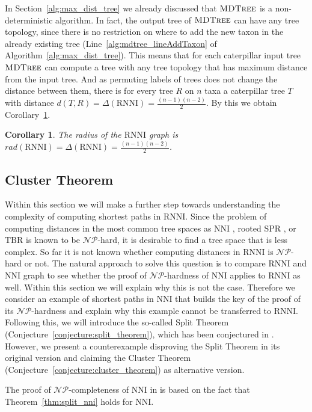 \documentclass{amsart}
\newcommand{\np}{\mathcal{NP}}
\newcommand{\nni}{\mathrm{NNI}}
\newcommand{\rnni}{\mathrm{RNNI}}
\newcommand{\tbr}{\mathrm{TBR}}
\newcommand{\spr}{\mathrm{SPR}}
\newcommand{\mdtree}{\textsc{MDTree}}
\newtheorem{corollary}[definition]{Corollary}
\begin{document}
In Section~\ref{alg:max_dist_tree} we already discussed that $\mdtree$ is a non-deterministic algorithm.
In fact, the output tree of $\mdtree$ can have any tree topology, since there is no restriction on where to add the new taxon in the already existing tree (Line~\ref{alg:mdtree_lineAddTaxon} of Algorithm~\ref{alg:max_dist_tree}).
This means that for each caterpillar input tree $\mdtree$ can compute a tree with any tree topology that has maximum distance from the input tree.
And as permuting labels of trees does not change the distance between them, there is for every tree $R$ on $n$ taxa a caterpillar tree $T$ with distance $d(T,R) = \Delta(\rnni) = \frac{(n-1)(n-2)}{2}$.
By this we obtain Corollary~\ref{corollary:radius}.

\begin{corollary}
The radius of the $\rnni$ graph is $rad(\rnni) = \Delta(\rnni) = \frac{(n-1)(n-2)}{2}$.
\label{corollary:radius}
\end{corollary}


\subsection{Cluster Theorem}
\label{section:cluster_theorem}

Within this section we will make a further step towards understanding the complexity of computing shortest paths in $\rnni$.
Since the problem of computing distances in the most common tree spaces as $\nni$ \autocite{Dasgupta2000-xa}, rooted $\spr$ \autocite{Bordewich2005-nx}, or $\tbr$ \autocite{Allen2001-ky} is known to be $\np$-hard, it is desirable to find a tree space that is less complex.
So far it is not known whether computing distances in $\rnni$ is $\np$-hard or not.
The natural approach to solve this question is to compare $\rnni$ and $\nni$ graph to see whether the proof of $\np$-hardness of $\nni$ applies to $\rnni$ as well.
Within this section we will explain why this is not the case.
Therefore we consider an example of shortest paths in $\nni$ that builds the key of the proof of its $\np$-hardness and explain why this example cannot be transferred to $\rnni$.
Following this, we will introduce the so-called Split Theorem (Conjecture~\ref{conjecture:split_theorem}), which has been conjectured in \autocite{Gavryushkin2018-ol}.
However, we present a counterexample disproving the Split Theorem in its original version and claiming the Cluster Theorem (Conjecture~\ref{conjecture:cluster_theorem}) as alternative version.

The proof of $\np$-completeness of $\nni$ in \autocite{Dasgupta2000-xa} is based on the fact that Theorem~\ref{thm:split_nni} holds for $\nni$.
\end{document}

